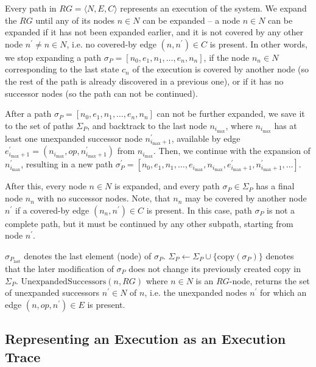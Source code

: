 Every path in $RG = \langle N, E, C \rangle$ represents an execution of the system. We expand the $RG$ until any of its nodes $n \in N$ can be expanded -- a node $n \in N$ can be expanded if it has not been expanded earlier, and it is not covered by any other node $n^\prime \neq n \in N$, i.e. no covered-by edge $(n, n^\prime) \in C$ is present. In other words, we stop expanding a path $\sigma_P = [n_0, e_1, n_1, \ldots, e_n, n_n]$, if the node $n_n \in N$ corresponding to the last state $c_n$ of the execution is covered by another node (so the rest of the path is already discovered in a previous one), or if it has no successor nodes (so the path can not be continued).

After a path $\sigma_P = [n_0, e_1, n_1, \ldots, e_n, n_n]$ can not be further expanded, we save it to the set of paths $\Sigma_P$, and backtrack to the last node $n_{i_{\mathrm{max}}}$, where $n_{i_{\mathrm{max}}}$ has at least one unexpanded successor node $n_{i_{\mathrm{max}}+1}^\prime$, available by edge $e_{i_{\mathrm{max}}+1}^\prime = (n_{i_{\mathrm{max}}}, op, n_{i_{\mathrm{max}}+1}^\prime)$ from $n_{i_{\mathrm{max}}}$. Then, we continue with the expansion of $n_{i_{\mathrm{max}}}^\prime$, resulting in a new path $\sigma_P^\prime = [n_0, e_1, n_1, \ldots, e_{i_{\mathrm{max}}}, n_{i_{\mathrm{max}}}, e_{i_{\mathrm{max}}+1}^\prime, n_{i_{\mathrm{max}}+1}^\prime, \ldots]$.

After this, every node $n \in N$ is expanded, and every path $\sigma_P \in \Sigma_P$ has a final node $n_n$ with no successor nodes. Note, that $n_n$ may be covered by another node $n^\prime$ if a covered-by edge $(n_n, n^\prime) \in C$ is present. In this case, path $\sigma_P$ is not a complete path, but it must be continued by any other subpath, starting from node $n^\prime$.

$\sigma_{P_\mathrm{last}}$ denotes the last element (node) of $\sigma_P$. $\Sigma_P \gets \Sigma_P \cup \{ \mathrm{copy}(\sigma_P) \}$ denotes that the later modification of $\sigma_P$ does not change its previously created copy in $\Sigma_P$. $\mathrm{UnexpandedSuccessors}(n, RG)$ where $n \in N$ is an $RG$-node, returns the set of unexpanded successors $n^\prime \in N$ of $n$, i.e. the unexpanded nodes $n^\prime$ for which an edge $(n, op, n^\prime) \in E$ is present.

\subsection{Representing an Execution as an Execution Trace}

